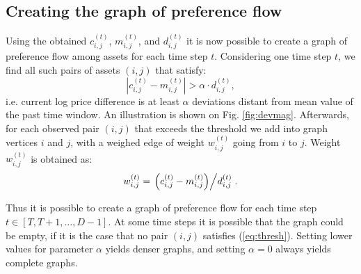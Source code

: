 \documentclass[letterpaper, 10pt, conference]{ieeeconf}
\begin{document}
  \subsection{Creating the graph of preference flow}
  \label{sub:creating-graph}
  Using the obtained $c_{i,j}^{(t)}$, $m_{i,j}^{(t)}$, and $d_{i,j}^{(t)}$ it is now possible to create a graph of preference flow among assets for each time step $t$.
  Considering one time step $t$, we find all such pairs of assets $(i,j)$ that satisfy:
  \begin{equation}
    \label{eq:thresh}
    \left| c_{i,j}^{(t)} - m_{i,j}^{(t)} \right| > \alpha \cdot d_{i,j}^{(t)},
  \end{equation}
  i.e. current log price difference is at least $\alpha$ deviations distant from mean value of the past time window.
  An illustration is shown on Fig. \ref{fig:devmag}.
  Afterwards, for each observed pair $(i,j)$ that exceeds the threshold we add into graph vertices $i$ and $j$, with a weighed edge of weight $w_{i,j}^{(t)}$ going from $i$ to $j$.
  Weight $w_{i,j}^{(t)}$ is obtained as:
  \begin{equation}
    \label{eq:weight}
    w_{i,j}^{(t)} = \left. \left(c_{i,j}^{(t)} - m_{i,j}^{(t)}\right) \middle/ d_{i,j}^{(t)} \right..
  \end{equation}
  
  Thus it is possible to create a graph of preference flow for each time step $t \in \left[T, T + 1, \ldots, D-1\right]$.
  At some time steps it is possible that the graph could be empty, if it is the case that no pair $(i,j)$ satisfies (\ref{eq:thresh}).
  Setting lower values for parameter $\alpha$ yields denser graphs, and setting $\alpha = 0$ always yields complete graphs.
  
\end{document}
